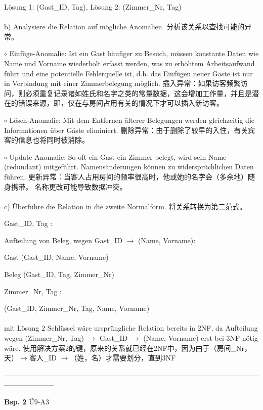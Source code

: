 \documentclass[fleqn]{article}
\begin{document}
Lösung 1: (Gast\_ID, Tag), Lösung 2: (Zimmer\_Nr, Tag)
\\
\\
b) Analysiere die Relation auf mögliche Anomalien. 分析该关系以查找可能的异常。

$\circ$ Einfüge-Anomalie: Ist ein Gast häufiger zu Besuch, müssen konstante Daten wie Name und Vorname wiederholt erfasst werden, was zu erhöhtem Arbeitsaufwand führt und eine potentielle Fehlerquelle ist, d.h. das Einfügen neuer Gäste ist nur in Verbindung mit einer Zimmerbelegung möglich.
插入异常：如果访客频繁访问，则必须重复记录诸如姓氏和名字之类的常量数据，这会增加工作量，并且是潜在的错误来源，即，仅在与房间占用有关的情况下才可以插入新访客。

$\circ$ Lösch-Anomalie: Mit dem Entfernen älterer Belegungen werden gleichzeitig die Informationen über Gäste eliminiert.
删除异常：由于删除了较早的入住，有关宾客的信息也将同时被消除。

$\circ$ Update-Anomalie: So oft ein Gast ein Zimmer belegt, wird sein Name (redundant) mitgeführt. Namensänderungen können zu widersprüchlichen Daten führen.
更新异常：当客人占用房间的频率很高时，他或她的名字会（多余地）随身携带。 名称更改可能导致数据冲突。
\\
\\
c) Überführe die Relation in die zweite Normalform. 将关系转换为第二范式。

Gast\_ID, Tag :

\indent\indent Aufteilung von Beleg, wegen Gast\_ID $\rightarrow$ (Name, Vorname):

\indent\indent\indent Gast (Gast\_ID, Name, Vorname)

\indent\indent\indent Beleg (Gast\_ID, Tag, Zimmer\_Nr)

Zimmer\_Nr, Tag :

\indent\indent (Gast\_ID, Zimmer\_Nr, Tag, Name, Vorname)
\\
\\
mit Lösung 2 Schlüssel wäre ursprüngliche Relation bereits in 2NF, da Aufteilung wegen (Zimmer\_Nr, Tag) $\rightarrow$ Gast\_ID $\rightarrow$ (Name, Vorname) erst bei 3NF nötig wäre.
使用解决方案2的键，原来的关系就已经在2NF中，因为由于（房间\_Nr，天）$ \rightarrow $客人\_ID $ \rightarrow $（姓，名）才需要划分，直到3NF

\noindent---------------------------------------------------------------------------------------------------------------------------------

\noindent\textbf{Bsp. 2} Ü9-A3
\end{document}
